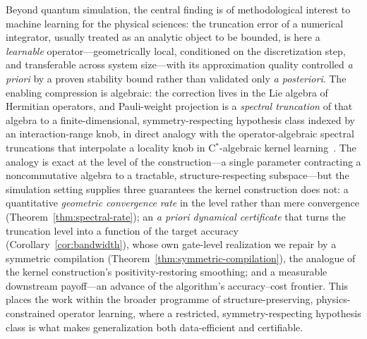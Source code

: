 \documentclass[aps,prxquantum,reprint,superscriptaddress,nofootinbib,amsmath,amssymb]{revtex4-2}
\begin{document}
Beyond quantum simulation, the central finding is of methodological interest to machine learning for the physical sciences: the truncation error of a numerical integrator, usually treated as an analytic object to be bounded, is here a \emph{learnable} operator---geometrically local, conditioned on the discretization step, and transferable across system size---with its approximation quality controlled \emph{a priori} by a proven stability bound rather than validated only \emph{a posteriori}. The enabling compression is algebraic: the correction lives in the Lie algebra of Hermitian operators, and Pauli-weight projection is a \emph{spectral truncation} of that algebra to a finite-dimensional, symmetry-respecting hypothesis class indexed by an interaction-range knob, in direct analogy with the operator-algebraic spectral truncations that interpolate a locality knob in C$^\ast$-algebraic kernel learning~\cite{hashimoto2024spectral,hashimoto2023rkhm}. The analogy is exact at the level of the construction---a single parameter contracting a noncommutative algebra to a tractable, structure-respecting subspace---but the simulation setting supplies three guarantees the kernel construction does not: a quantitative \emph{geometric convergence rate} in the level rather than mere convergence (Theorem~\ref{thm:spectral-rate}); an \emph{a priori dynamical certificate} that turns the truncation level into a function of the target accuracy (Corollary~\ref{cor:bandwidth}), whose own gate-level realization we repair by a symmetric compilation (Theorem~\ref{thm:symmetric-compilation}), the analogue of the kernel construction's positivity-restoring smoothing; and a measurable downstream payoff---an advance of the algorithm's accuracy--cost frontier. This places the work within the broader programme of structure-preserving, physics-constrained operator learning, where a restricted, symmetry-respecting hypothesis class is what makes generalization both data-efficient and certifiable.
\end{document}
